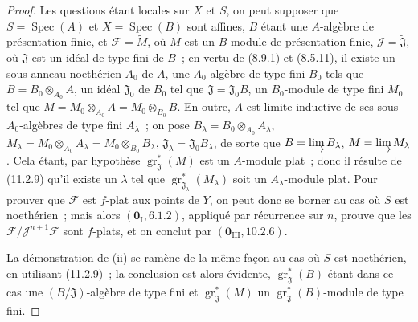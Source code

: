 \begin{proof}
Les questions étant locales sur $X$ et $S$, on peut supposer que
$S=\operatorname{Spec}(A)$ et $X=\operatorname{Spec}(B)$ sont affines, $B$ étant
une $A$-algèbre de présentation finie, et $\mathcal F=\widetilde M$, où $M$ est
un $B$-module de présentation finie, $\mathcal J=\widetilde{\mathfrak J}$, où
$\mathfrak J$ est un idéal de type fini de $B$~; en vertu de (8.9.1) et
(8.5.11), il existe un sous-anneau noethérien $A_0$ de $A$, une $A_0$-algèbre
de type fini $B_0$ tels que $B=B_0\otimes_{A_0}A$, un idéal $\mathfrak J_0$ de
$B_0$ tel que $\mathfrak J=\mathfrak J_0B$, un $B_0$-module de type fini $M_0$
tel que $M=M_0\otimes_{A_0}A=M_0\otimes_{B_0}B$. En outre, $A$ est limite
inductive de ses sous-$A_0$-algèbres de type fini $A_\lambda$~; on pose
$B_\lambda=B_0\otimes_{A_0}A_\lambda$,
$M_\lambda=M_0\otimes_{A_0}A_\lambda=M_0\otimes_{B_0}B_\lambda$,
$\mathfrak J_\lambda=\mathfrak J_0B_\lambda$, de sorte que
$B=\varinjlim B_\lambda$, $M=\varinjlim M_\lambda$. Cela étant, par hypothèse
$\operatorname{gr}_{\mathfrak J}^*(M)$ est un $A$-module plat~; donc il résulte
de (11.2.9) qu'il existe un $\lambda$ tel que
$\operatorname{gr}_{\mathfrak J_\lambda}^*(M_\lambda)$ soit un
$A_\lambda$-module plat. Pour prouver que $\mathcal F$ est $f$-plat aux points
de $Y$, on peut donc se borner au cas où $S$ est noethérien~; mais alors
$(\mathbf 0_{\mathrm I},6.1.2)$, appliqué par récurrence sur $n$, prouve que les
$\mathcal F/\mathcal J^{n+1}\mathcal F$ sont $f$-plats, et on conclut par
$(\mathbf 0_{\mathrm{III}},10.2.6)$.


La démonstration de (ii) se ramène de la même façon au cas où $S$ est
noethérien, en utilisant (11.2.9)~; la conclusion est alors évidente,
$\operatorname{gr}_{\mathfrak J}^*(B)$ étant dans ce cas une
$(B/\mathfrak J)$-algèbre de type fini et
$\operatorname{gr}_{\mathfrak J}^*(M)$ un
$\operatorname{gr}_{\mathfrak J}^*(B)$-module de type fini.


\end{proof}
